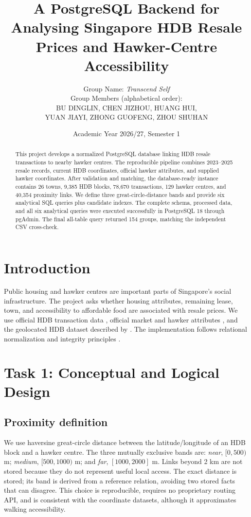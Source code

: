 \documentclass[11pt,a4paper]{article}
\title{\textbf{A PostgreSQL Backend for Analysing Singapore HDB Resale Prices and Hawker-Centre Accessibility}}
\author{Group Name: \textit{Transcend Self}\\
\small Group Members (alphabetical order):\\
\small BU DINGLIN, CHEN JIZHOU, HUANG HUI,\\
\small YUAN JIAYI, ZHONG GUOFENG, ZHOU SHUHAN}
\date{Academic Year 2026/27, Semester 1}
\begin{document}
\maketitle
\begin{abstract}
This project develops a normalized PostgreSQL database linking HDB resale
transactions to nearby hawker centres. The reproducible pipeline combines 2023--2025
resale records, current HDB coordinates, official hawker attributes, and supplied hawker
coordinates. After validation and matching, the database-ready instance contains 26 towns,
9,385 HDB blocks, 78,670 transactions, 129 hawker centres, and 40,354 proximity links.
We define three great-circle-distance bands and provide six analytical SQL queries plus
candidate indexes. The complete schema, processed data, and all six analytical queries
were executed successfully in PostgreSQL 18 through pgAdmin. The final all-table query
returned 154 groups, matching the independent CSV cross-check.
\end{abstract}

\tableofcontents
\newpage

\section{Introduction}
Public housing and hawker centres are important parts of Singapore's social infrastructure.
The project asks whether housing attributes, remaining lease, town, and accessibility to
affordable food are associated with resale prices. We use official HDB transaction data
\citep{datagov_resale}, official market and hawker attributes \citep{datagov_hawker}, and
the geolocated HDB dataset described by \citet{lan2022site}. The implementation follows
relational normalization and integrity principles \citep{elmasri2016fundamentals}.

\section{Task 1: Conceptual and Logical Design}
\subsection{Proximity definition}
We use haversine great-circle distance between the latitude/longitude of an HDB block and
a hawker centre. The three mutually exclusive bands are: \emph{near}, $[0,500)$ m;
\emph{medium}, $[500,1000)$ m; and \emph{far}, $[1000,2000]$ m. Links beyond 2 km are
not stored because they do not represent useful local access. The exact distance is stored;
its band is derived from a reference relation, avoiding two stored facts that can disagree.
This choice is reproducible, requires no proprietary
routing API, and is consistent with the coordinate datasets, although it approximates
walking accessibility.
\end{document}
